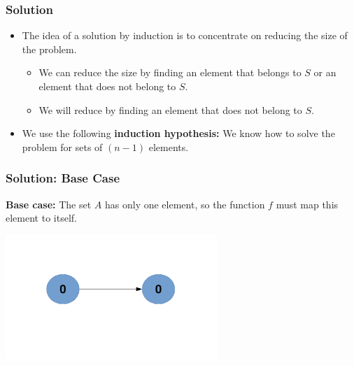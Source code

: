 \documentclass{beamer}
\begin{document}
\begin{frame}
\frametitle{Solution}

\begin{itemize}

\item The idea of a solution by induction is to concentrate on reducing the size of the problem.
\begin{itemize}
\item We can reduce the size by finding an element that belongs to $S$ or an element that does not belong to $S$.
\vspace{0.2cm}
\item We will reduce by finding an element that does not belong to $S$.
\end{itemize}
\vspace{0.5cm}
\item<2> We use the following \textbf{induction hypothesis:} We know how to solve the problem for sets of $(n - 1)$ elements.

\end{itemize}

\end{frame}

\begin{frame}[containsverbatim]
\frametitle{Solution: Base Case}

\textbf{Base case:} The set $A$ has only one element, so the function $f$ must map this element to itself.

\begin{center}
\includegraphics[width=8cm]{mappings_base_case.pdf}%
\end{center}

\end{frame}
\end{document}
